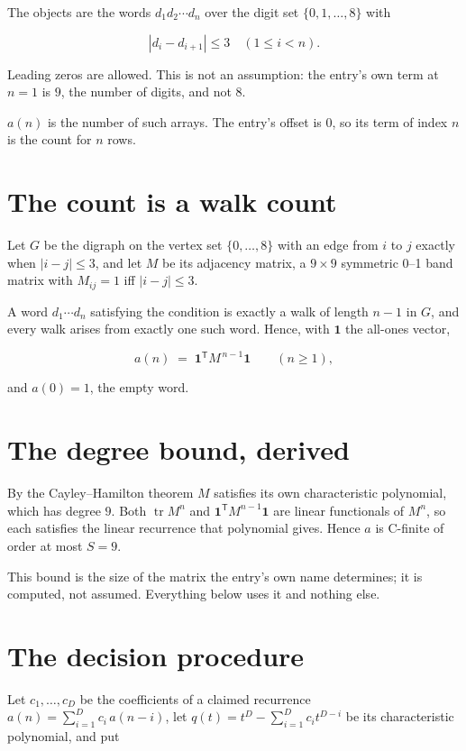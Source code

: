 \documentclass[11pt]{article}
\theoremstyle{definition}
\begin{document}
The objects are the words $d_1 d_2 \cdots d_n$ over the digit set $\{0,1,\dots,8\}$ with

\[|d_i - d_{i+1}| \le 3\quad (1 \le i < n).\]

Leading zeros are allowed. This is not an assumption: the entry's own term at $n=1$ is $9$, the number of digits, and not $8$.

$a(n)$ is the number of such arrays. The entry's offset is 0, so its term of index $n$ is the count for $n$ rows.

\section{The count is a walk count}

Let $G$ be the digraph on the vertex set $\{0,\dots,8\}$ with an edge from $i$ to $j$ exactly when $|i-j| \le 3$, and let $M$ be its adjacency matrix, a $9 \times 9$ symmetric 0--1 band matrix with $M_{ij} = 1$ iff $|i-j| \le 3$.

A word $d_1\cdots d_n$ satisfying the condition is exactly a walk of length $n-1$ in $G$, and every walk arises from exactly one such word. Hence, with $\mathbf 1$ the all-ones vector,

\[a(n) \;=\; \mathbf 1^{\mathsf T} M^{\,n-1} \mathbf 1 \qquad (n \ge 1),\]

and $a(0) = 1$, the empty word.

\section{The degree bound, derived}

By the Cayley--Hamilton theorem $M$ satisfies its own characteristic polynomial, which has degree $9$. Both $\operatorname{tr} M^n$ and $\mathbf 1^{\mathsf T} M^{n-1} \mathbf 1$ are linear functionals of $M^{n}$, so each satisfies the linear recurrence that polynomial gives. Hence $a$ is C-finite of order at most $S = 9$.

This bound is the size of the matrix the entry's own name determines; it is computed, not assumed. Everything below uses it and nothing else.

\section{The decision procedure}

Let $c_1,\dots,c_D$ be the coefficients of a claimed recurrence $a(n) = \sum_{i=1}^{D} c_i\,a(n-i)$, let $q(t) = t^{D} - \sum_{i=1}^{D} c_i t^{D-i}$ be its characteristic polynomial, and put
\end{document}
